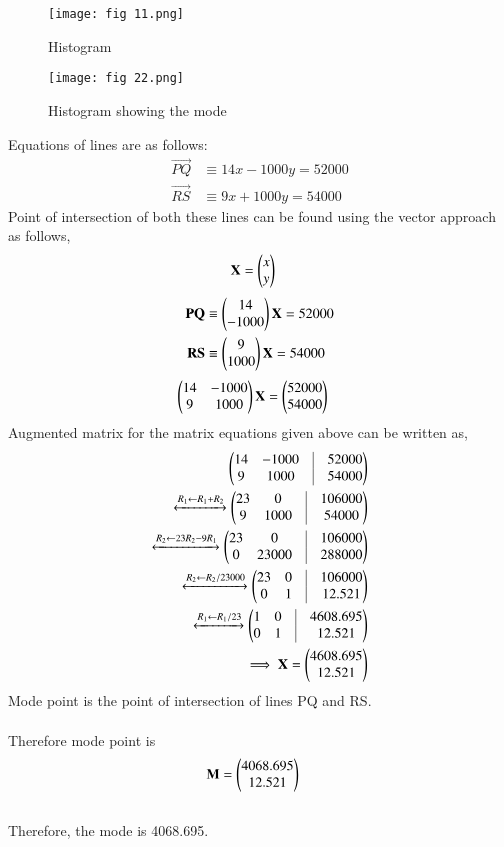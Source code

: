 \documentclass[journal,12pt,twocolumn]{IEEEtran}
\begin{document}
\begin{figure}[ht]
    \centering
    \texttt{[image: fig 11.png]}
    \caption{Histogram}
    \label{Fig 1.1}
\end{figure}
\begin{figure}[ht]
    \centering
    \texttt{[image: fig 22.png]}
    \caption{Histogram showing the mode}
    \label{}
\end{figure}
Equations of lines are as follows:\\
\begin{align}
    \vec{PQ} &\equiv 14x - 1000y =  52000 \\ \vec{RS} &\equiv 9x + 1000y =  54000 
\end{align}
Point of intersection of both these lines can be found using the vector approach as follows,\\
\begin{align}
\mathbf{X} &= \begin{pmatrix}x \\ y\end{pmatrix}
\end{align}
\begin{align}
\mathbf{PQ} &\equiv \begin{pmatrix}14 \\ -1000\end{pmatrix}\mathbf{X} = 52000\\
\mathbf{RS} &\equiv \begin{pmatrix}9 \\ 1000\end{pmatrix}\mathbf{X} = 54000
\end{align}
\begin{align}
\begin{pmatrix}14 & -1000 \\
		9 & 1000\end{pmatrix}\mathbf{X} &= \begin{pmatrix}52000 \\ 54000\end{pmatrix}
\end{align}	
Augmented matrix for the matrix equations given above can be written as,\\
\begin{align}
	\myvec{ 14 & -1000 & \vrule & 52000 \\
		9 & 1000 & \vrule & 54000} \\
	\xleftrightarrow[]{R_1 \leftarrow R_1+R_2}
		\myvec{ 23 & 0 & \vrule & 106000 \\
			9 & 1000 & \vrule & 54000} \\
	\xleftrightarrow[]{R_2 \leftarrow 23R_2-9R_1}
		\myvec{ 23 & 0 & \vrule & 106000 \\
			0 & 23000 &\vrule & 288000} \\
	\xleftrightarrow[]{R_2 \leftarrow R_2/23000}
		\myvec{ 23 & 0 & \vrule & 106000 \\
			0 & 1 & \vrule & 12.521} \\
	\xleftrightarrow[]{ R_1 \leftarrow R_1/23}
		\myvec{ 1 & 0 & \vrule & 4608.695 \\
			0 & 1 & \vrule & 12.521} \\
	\implies \vec{X} = \myvec{4608.695 \\ 12.521}
\end{align}
Mode point is the point of intersection of lines PQ and RS.\\\\
Therefore mode point is\\
\begin{align}
	\mathbf{M} &= \begin{pmatrix}4068.695 \\ 12.521\end{pmatrix}
\end{align}\\
Therefore, the mode is 4068.695.\\
\end{document}
